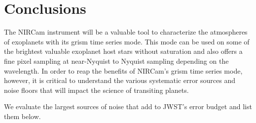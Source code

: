 \documentclass{aastex62}
\begin{document}
\section{Conclusions}\label{sec:Conclusion}
The NIRCam instrument will be a valuable tool to characterize the atmospheres of exoplanets with its grism time series mode.
This mode can be used on some of the brightest valuable exoplanet host stars without saturation and also offers a fine pixel sampling at near-Nyquist to Nyquist sampling depending on the wavelength.
In order to reap the benefits of NIRCam's grism time series mode, however, it is critical to understand the various systematic error sources and noise floors that will impact the science of transiting planets.

We evaluate the largest sources of noise that add to JWST's error budget and list them below.
\end{document}
